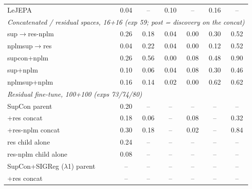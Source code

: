\begin{center}
\begin{longtable}{lcccccc}
\quad LeJEPA & 0.04 & -- & 0.10 & -- & 0.16 & -- \\
\multicolumn{7}{l}{\emph{Concatenated / residual spaces, 16+16 (exp 59; post = discovery on the concat)}} \\
\quad sup$\to$res-nplm & 0.26 & 0.18 & 0.04 & 0.00 & 0.30 & 0.52 \\
\quad nplmsup$\to$res & 0.04 & 0.22 & 0.04 & 0.00 & 0.12 & 0.52 \\
\quad supcon+nplm & 0.26 & 0.56 & 0.00 & 0.08 & 0.48 & 0.90 \\
\quad sup+nplm & 0.10 & 0.06 & 0.04 & 0.08 & 0.30 & 0.46 \\
\quad nplmsup+nplm & 0.16 & 0.14 & 0.02 & 0.00 & 0.62 & 0.62 \\
\multicolumn{7}{l}{\emph{Residual fine-tune, 100+100 (exps 73/74/80)}} \\
\quad SupCon parent & 0.20 & -- & -- & -- & -- & -- \\
\quad\quad +res concat & 0.18 & 0.06 & -- & 0.08 & -- & 0.32 \\
\quad\quad +res-nplm concat & 0.30 & 0.18 & -- & 0.02 & -- & 0.84 \\
\quad\quad res child alone & 0.24 & -- & -- & -- & -- & -- \\
\quad\quad res-nplm child alone & 0.08 & -- & -- & -- & -- & -- \\
\quad SupCon+SIGReg ($\lambda$1) parent & -- & -- & -- & -- & -- & -- \\
\quad\quad +res concat & -- & -- & -- & -- & -- & -- \\
\end{longtable}
\end{center}
